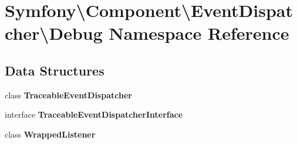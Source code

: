 \section{Symfony\textbackslash{}Component\textbackslash{}Event\+Dispatcher\textbackslash{}Debug Namespace Reference}
\label{namespace_symfony_1_1_component_1_1_event_dispatcher_1_1_debug}
\subsection*{Data Structures}
\begin{DoxyCompactItemize}
\item 
class {\bf Traceable\+Event\+Dispatcher}
\item 
interface {\bf Traceable\+Event\+Dispatcher\+Interface}
\item 
class {\bf Wrapped\+Listener}
\end{DoxyCompactItemize}
